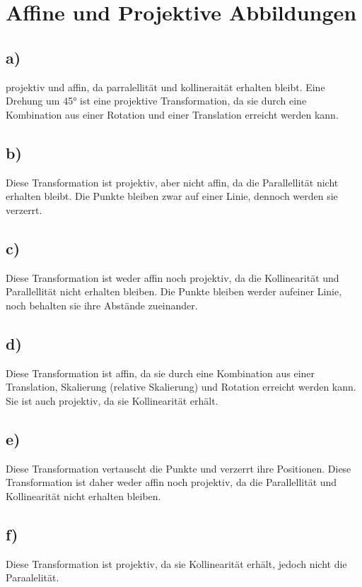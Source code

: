 \documentclass{article}
\begin{document}
\section{Affine und Projektive Abbildungen}
\subsection*{a)}
projektiv und affin, da parralellität und kollineraität erhalten bleibt. Eine Drehung um 45° ist eine projektive Transformation, da sie durch eine Kombination aus einer Rotation und einer Translation erreicht werden kann.
\subsection*{b)}
Diese Transformation ist projektiv, aber nicht affin, da die Parallellität nicht erhalten bleibt. Die Punkte bleiben zwar auf einer Linie, dennoch werden sie verzerrt.
\subsection*{c)}
Diese Transformation ist weder affin noch projektiv, da die Kollinearität und Parallellität nicht erhalten bleiben. Die Punkte bleiben werder aufeiner Linie, noch behalten sie ihre Abstände zueinander.
\subsection*{d)}
Diese Transformation ist affin, da sie durch eine Kombination aus einer Translation, Skalierung (relative Skalierung) und Rotation erreicht werden kann. Sie ist auch projektiv, da sie Kollinearität erhält.
\subsection*{e)}
Diese Transformation vertauscht die Punkte und verzerrt ihre Positionen. Diese Transformation ist daher weder affin noch projektiv, da die Parallellität und Kollinearität nicht erhalten bleiben.
\subsection*{f)}
Diese Transformation ist projektiv, da sie Kollinearität erhält, jedoch nicht die Paraalelität.
\end{document}
